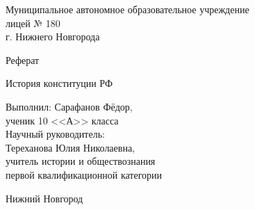 \begin{titlepage}
\newpage

\begin{center}

Муниципальное автономное образовательное учреждение \\
лицей № 180 \\
г. Нижнего Новгорода \\

\end{center}
 

\vspace{14em}

\begin{center}
\large{Реферат}
\end{center}

 
\begin{center}
История конституции РФ
\end{center}

\vspace{4.5em}
 
\begin{flushright}
Выполнил: Сарафанов Фёдор, \\
ученик 10 <<А>> класса \\
Научный руководитель: \\
Тереханова Юлия Николаевна, \\
учитель истории и обществознания \\ 
первой квалификационной категории
\end{flushright}
 
\vspace{\fill}

\begin{center}
Нижний Новгород \\
\the\year
\end{center}

\end{titlepage}